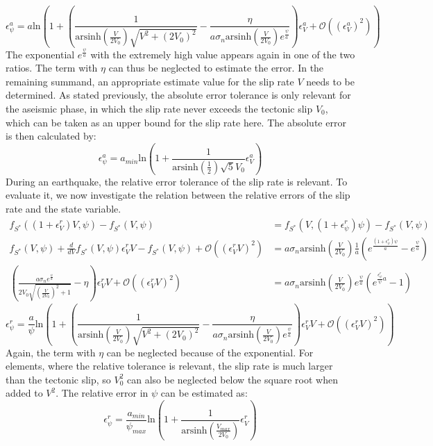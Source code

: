 \begin{equation}
	 \epsilon_\psi^a 
	= a\text{ln}\left(1 + \left( \frac{1}{\text{arsinh}\left(\frac{V}{2V_0}\right)\sqrt{V^2 + (2V_0)^2}} - \frac{\eta}{a \sigma_n \text{arsinh}\left(\frac{V}{2V_0}\right) e^{\frac{\psi}{a}}} \right)\epsilon_V^a + \mathcal{O}\left(\left(\epsilon_V^a\right)^2\right)\right)
\end{equation}
The exponential $e^{\frac{\psi}{a}}$ with the extremely high value appears again in one of the two ratios. The term with $\eta$ can thus be neglected to estimate the error. In the remaining summand, an appropriate estimate value for the slip rate $V$ needs to be determined. As stated previously, the absolute error tolerance is only relevant for the aseismic phase, in which the slip rate never exceeds the tectonic slip $V_0$, which can be taken as an upper bound for the slip rate here. The absolute error is then calculated by: 
\begin{equation}
	\label{eq:absoluteErrorPSIFromV}
	 \epsilon_\psi^a 
	= a_{min}\text{ln}\left(1 +  \frac{1}{\text{arsinh}\left(\frac{1}{2}\right)\sqrt{5}V_0}\epsilon_V^a\right)
\end{equation}
During an earthquake, the relative error tolerance of the slip rate is relevant. To evaluate it, we now investigate the relation between the relative errors of the slip rate and the state variable. 
\begin{align}
	f_{S^*}((1+\epsilon_V^r)V,\psi) - f_{S^*}(V,\psi) &= f_{S^*}(V,(1+\epsilon_\psi^r)\psi) - f_{S^*}(V,\psi) \\
	f_{S^*}(V,\psi) + \frac{d}{dV}f_{S^*}(V,\psi)\epsilon_V^rV - f_{S^*}(V,\psi) + \mathcal{O}\left(\left(\epsilon_V^rV\right)^2\right)&= a \sigma_n \text{arsinh}\left(\frac{V}{2V_0}\right)\frac{1}{a}\left(e^{\frac{(1+\epsilon_\psi^r)\psi}{a}} - e^{\frac{\psi}{a}}\right) \\
	\left( \frac{a\sigma_ne^{\frac{\psi}{a}}} {2V_0\sqrt{\left(\frac{V}{2V_0}\right)^2+1}}- \eta \right)\epsilon_V^rV + \mathcal{O}\left(\left(\epsilon_V^rV\right)^2\right) &= a \sigma_n \text{arsinh}\left(\frac{V}{2V_0}\right) e^{\frac{\psi}{a}}\left(e^{\frac{\epsilon_\psi^r}\psi{a}} - 1\right)
\end{align}
\begin{equation}
	\epsilon_\psi^r = \frac{a}{\psi}\text{ln}\left(1 + \left( \frac{1}{\text{arsinh}\left(\frac{V}{2V_0}\right)\sqrt{V^2 + (2V_0)^2}} - \frac{\eta}{a \sigma_n \text{arsinh}\left(\frac{V}{2V_0}\right) e^{\frac{\psi}{a}}} \right)\epsilon_V^rV + \mathcal{O}\left(\left(\epsilon_V^rV\right)^2\right)\right)
\end{equation}
Again, the term with $\eta$ can be neglected because of the exponential. For elements, where the relative tolerance is relevant, the slip rate is much larger than the tectonic slip, so $V_0^2$ can also be neglected below the square root when added to $V^2$. The relative error in $\psi$ can be estimated as: 
\begin{equation}
	\label{eq:relativeErrorPSIFromV}
	\epsilon_\psi^r = \frac{a_{min}}{\psi_{max}}\text{ln}\left(1 + \frac{1}{\text{arsinh}\left(\frac{V_{max}}{2V_0}\right)}\epsilon_V^r\right)
\end{equation}

